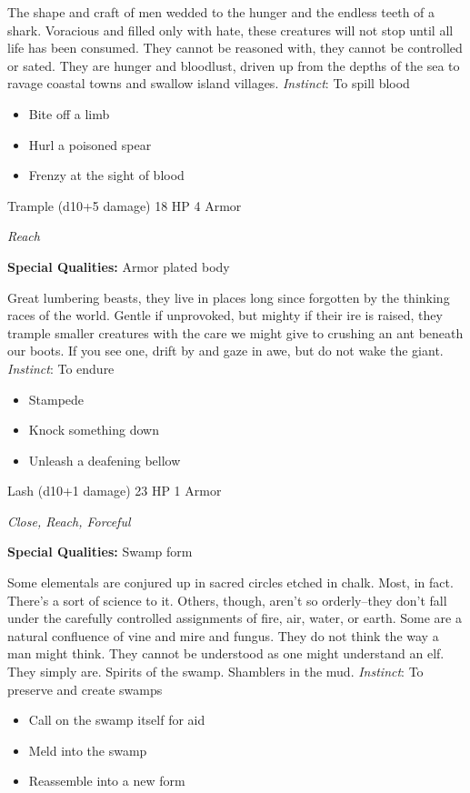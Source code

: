 \HRule
The shape and craft of men wedded to the hunger and the endless teeth of a shark. Voracious and filled only with hate, these creatures will not stop until all life has been consumed. They cannot be reasoned with, they cannot be controlled or sated. They are hunger and bloodlust, driven up from the depths of the sea to ravage coastal towns and swallow island villages. \emph{Instinct}: To spill blood
\begin{itemize}
\item Bite off a limb
\item Hurl a poisoned spear
\item Frenzy at the sight of blood
\end{itemize}
\newpage
\HRule
{}

Trample (d10+5 damage)\hspace*{\fill} 18 HP 4 Armor

\emph{Reach}

\textbf{Special Qualities:}
Armor plated body

\HRule
Great lumbering beasts, they live in places long since forgotten by the thinking races of the world. Gentle if unprovoked, but mighty if their ire is raised, they trample smaller creatures with the care we might give to crushing an ant beneath our boots. If you see one, drift by and gaze in awe, but do not wake the giant. \emph{Instinct}: To endure
\begin{itemize}
\item Stampede
\item Knock something down
\item Unleash a deafening bellow
\end{itemize}

\HRule
{}

Lash (d10+1 damage)\hspace*{\fill} 23 HP 1 Armor

\emph{Close, Reach, Forceful}

\textbf{Special Qualities:}
Swamp form

\HRule
Some elementals are conjured up in sacred circles etched in chalk. Most, in fact. There's a sort of science to it. Others, though, aren't so orderly--they don't fall under the carefully controlled assignments of fire, air, water, or earth. Some are a natural confluence of vine and mire and fungus. They do not think the way a man might think. They cannot be understood as one might understand an elf. They simply are. Spirits of the swamp. Shamblers in the mud. \emph{Instinct}: To preserve and create swamps
\begin{itemize}
\item Call on the swamp itself for aid
\item Meld into the swamp
\item Reassemble into a new form
\end{itemize}
\newpage
\HRule
{}


